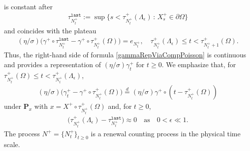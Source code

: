 \documentclass[11pt,a4paper]{article}
\begin{document}
{\begin{align*}
\end{align*}
is constant after 
\begin{align*}
\tau^\texttt{last}_{N^+_t} := \sup\{s < \tau^+_{N^+_t}(\Lambda_\epsilon)\,:\, X^+_s \in \partial \Omega \}
\end{align*}
and coincides with the plateau
\begin{align*}
(\eta/\sigma)  \bigg( \gamma^+ \circ\tau^\texttt{last}_{N^+_t} - \gamma^+ \circ \tau^+_{N^+_t}(\Omega)\bigg) = e_{N^+_t}, \quad \tau^+_{N^+_t}(\Lambda_\epsilon) \leq t <  \tau^+_{N^+_t+1}(\Omega).
\end{align*}
Thus, the right-hand side of formula \eqref{gammaRepViaCompPoisson} is continuous and provides a representation of $(\eta/\sigma) \gamma^+_t$ for $t\geq 0$. We emphasize that, for $\tau^+_{N^+_t}(\Omega) \leq t < \tau^+_{N^+_t}(\Lambda_\epsilon)$,
\begin{align*}
(\eta/\sigma)  \bigg( \gamma^+_t - \gamma^+ \circ \tau^+_{N^+_t}(\Omega)\bigg) \stackrel{d}{=} (\eta/\sigma)  \gamma^+ \circ ( t - \tau^+_{N^+_t}(\Omega))
\end{align*}
under $\mathbf{P}_x$ with $x=X^+ \circ \tau^+_{N^+_t}(\Omega)$ and, for $t \geq 0$, 
\begin{align*}
\big(\tau^+_{N^+_t}(\Lambda_\epsilon) - \tau^\texttt{last}_{N^+_t}\big) \approx 0 \quad \textrm{as} \quad 0 < \epsilon \ll 1.
\end{align*}
The process $N^+=\{N^+_t\}_{t \geq 0}$ is a renewal counting process in the physical time scale. 


}
\end{document}
